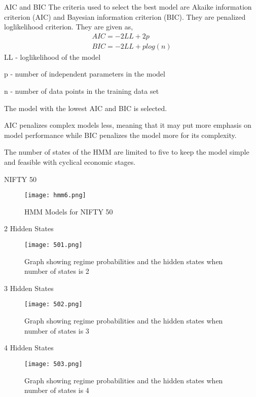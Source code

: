 \documentclass{beamer}
\begin{document}
\begin{frame}{AIC and BIC}
     The criteria used to select the best model are Akaike information criterion (AIC) and Bayesian information criterion (BIC). They are penalized loglikelihood criterion. They are given as,
    \begin{align}
        AIC = -2 LL + 2p\\
        BIC = -2 LL + plog(n)
    \end{align}
    LL - loglikelihood of the model 
    
    p - number of independent parameters in the model
    
    n - number of data points in the training data set
    
    The model with the lowest AIC and BIC is selected.
    
    AIC penalizes complex models less, meaning that it may put more emphasis on model performance while BIC penalizes the model more for its complexity.
    
    The number of states of the HMM are limited to five to keep the model simple and feasible with cyclical economic stages.
\end{frame}
\begin{frame}{NIFTY 50}
\begin{figure}[H]
\centering
\texttt{[image: hmm6.png]}
\caption{HMM Models for NIFTY 50}
\label{fig3}
\end{figure}

\end{frame}
\begin{frame}{2 Hidden States}
\begin{figure}[H]
\centering
\texttt{[image: 501.png]}
\caption{Graph showing regime probabilities and the hidden states when number of states is 2}
\label{fig4}
\end{figure}    
\end{frame}
\begin{frame}{3 Hidden States}
\begin{figure}[H]
\centering
\texttt{[image: 502.png]}
\caption{Graph showing regime probabilities and the hidden states when number of states is 3}
\label{fig5}
\end{figure}    
\end{frame}
\begin{frame}{4 Hidden States}
\begin{figure}[H]
\centering
\texttt{[image: 503.png]}
\caption{Graph showing regime probabilities and the hidden states when number of states is 4}
\label{fig6}
\end{figure}    
\end{frame}
\end{document}
